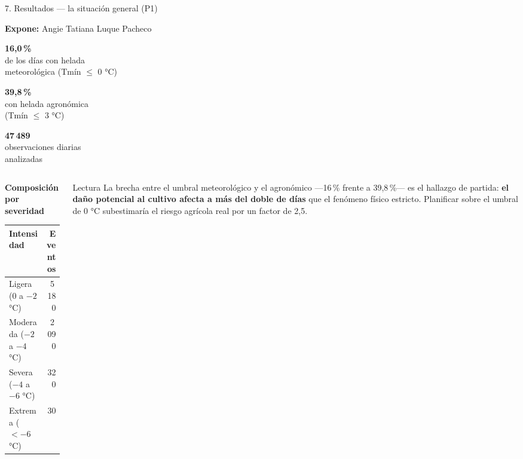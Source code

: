 \documentclass[aspectratio=169,11pt]{beamer}
\newcommand{\ponente}[1]{%
  \begin{flushright}\tiny\textcolor{pnBrandDark}{\textbf{Expone:} #1}\end{flushright}%
  \vspace{-0.9em}%
}
\newcommand{\cifra}[2]{%
  \begin{minipage}[t]{0.30\textwidth}
    \centering
    \colorbox{pnBrandSoft}{\parbox[c][2.5cm][c]{0.92\linewidth}{%
      \centering
      {\LARGE\bfseries\textcolor{pnBrandDark}{#1}}\\[0.35em]
      {\scriptsize\textcolor{pnInkSoft}{#2}}%
    }}
  \end{minipage}%
}
\begin{document}
\begin{frame}{7. Resultados — la situación general (P1)}
  \ponente{Angie Tatiana Luque Pacheco}
  \begin{center}
    \cifra{16,0\,\%}{de los días con helada\\meteorológica (Tmín $\leq$ 0 °C)}\hfill
    \cifra{39,8\,\%}{con helada agronómica\\(Tmín $\leq$ 3 °C)}\hfill
    \cifra{47\,489}{observaciones diarias\\analizadas}
  \end{center}
  \vspace{0.6em}
  \small
  \begin{columns}[T]
    \begin{column}{0.48\textwidth}
      \textbf{Composición por severidad}
      \scriptsize
      \begin{tabular}{@{}lr@{}}
        \toprule
        Intensidad & Eventos \\
        \midrule
        Ligera (0 a $-2$ °C)     & 5\,180 \\
        Moderada ($-2$ a $-4$ °C)  & 2\,090 \\
        Severa ($-4$ a $-6$ °C)    & 320 \\
        Extrema ($< -6$ °C)      & 30 \\
        \bottomrule
      \end{tabular}
    \end{column}
    \begin{column}{0.48\textwidth}
      \begin{block}{Lectura}
        \scriptsize La brecha entre el umbral meteorológico y el agronómico —16\,\% frente a
        39,8\,\%— es el hallazgo de partida: \textbf{el daño potencial al cultivo afecta a más del
        doble de días} que el fenómeno físico estricto. Planificar sobre el umbral de 0 °C
        subestimaría el riesgo agrícola real por un factor de 2,5.
      \end{block}
    \end{column}
  \end{columns}
\end{frame}
\end{document}
